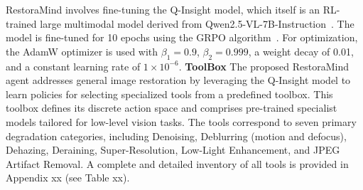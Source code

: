 RestoraMind involves fine-tuning the Q-Insight model, which itself is an RL-trained large multimodal model derived from Qwen2.5-VL-7B-Instruction~\cite{bai2025qwen2}. The model is fine-tuned for 10 epochs using the GRPO algorithm~\cite{Shao2024DeepSeekMathPT}. For optimization, the AdamW optimizer is used with $\beta_1=0.9$, $\beta_2=0.999$, a weight decay of 0.01, and a constant learning rate of $1 \times 10^{-6}$. 
\textbf{ToolBox}
The proposed RestoraMind agent addresses general image restoration by leveraging the Q-Insight model to learn policies for selecting specialized tools from a predefined toolbox. This toolbox defines its discrete action space and comprises pre-trained specialist models tailored for low-level vision tasks. The tools correspond to seven primary degradation categories, including Denoising, Deblurring (motion and defocus), Dehazing, Deraining, Super-Resolution, Low-Light Enhancement, and JPEG Artifact Removal. A complete and detailed inventory of all tools is provided in Appendix xx (see Table xx).

